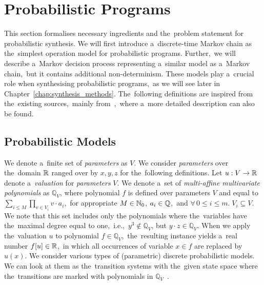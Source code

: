 \chapter{Probabilistic Programs}\label{chap:preliminaries}

This section formalises necessary ingredients and the~problem statement for probabilistic synthesis.
We will first introduce a~discrete-time Markov chain as the~simplest operation model for probabilistic programs.
Further,~we will describe a~Markov decision process representing a~similar model as a~Markov chain,~but it contains additional non-determinism.
These models play a~crucial role when synthesising probabilistic programs,~as we will see later in Chapter~\ref{chap:synthesis_methods}.
The~following definitions are inspired from the~existing sources,~mainly from~\cite{tacas21,Quatmann2016},~where a~more detailed description can also be found.

\section{Probabilistic Models}

We denote a~finite set of \textit{parameters} as $V$.
We consider \textit{parameters} over the~domain $\mathbb{R}$ ranged over by $x,y,z$ for the~following definitions.
Let $u: V \rightarrow \mathbb{R}$ denote a~\textit{valuation} for \textit{parameters} $V$.
We denote a~set of \textit{multi-affine multivariate polynomials} as $\mathbb{Q}_V$, where polynomial $f$ is defined over parameters $V$ and equal to $\sum_{i \leq M}{\prod_{v\in V_i}v \cdot a_i}$,~for appropriate $M \in \mathbb{N}_0$, $a_i \in \mathbb{Q}$,~and $\forall \, 0 \leq i \leq m. \; V_i \subseteq V$.
We note that this set includes only the polynomials where the~variables have the~maximal degree equal to one,~i.e.,~$y^3 \notin \mathbb{Q}_V$, but $y \cdot z \in \mathbb{Q}_V$.
When we apply the~valuation $u$ to polynomial $f \in \mathbb{Q}_V$,~the~resulting instance yields a~real number $f[u] \in \mathbb{R}$,~in which all occurrences of variable $x \in f$ are replaced by $u(x)$.
We consider various types of (parametric) discrete probabilistic models.
We can look at them as the~transition systems with the~given state space where the~transitions are marked with polynomials in $\mathbb{Q}_V$~\cite{Quatmann2016}.

